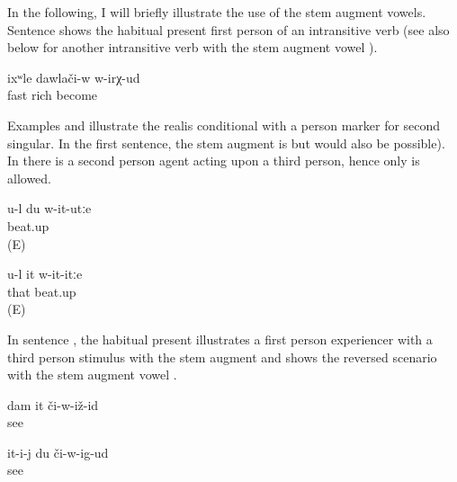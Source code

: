 In the following, I will briefly illustrate the use of the stem augment vowels. Sentence  shows the habitual present first person of an intransitive verb (see also  below for another intransitive verb with the stem augment vowel ).
%
\begin{exe}
	\ex	\label{ex:‎‎‎I become rich fast}
	\gll	ixʷle	dawlači-w	w-irχ-ud\\
		fast	rich	become\\
	\glt	{}
\end{exe}

Examples  and  illustrate the realis conditional with a person marker for second singular. In the first sentence, the stem augment is  but  would also be possible). In  there is a second person agent acting upon a third person, hence only  is allowed. 
%
\begin{exe}
	\ex	\label{ex:if you beat me up}
	\gll	u-l	du	w-it-utːe\\
				beat.up\\
	\glt	{} (E)

	\ex	\label{ex:if you beat him up}
	\gll	u-l	it	w-it-itːe\\
			that	beat.up\\
	\glt	{} (E)
\end{exe}

In sentence , the habitual present illustrates a first person experiencer with a third person stimulus with the stem augment  and  shows the reversed scenario with the stem augment vowel .
%
\begin{exe}
	\ex	\label{ex:habitual present stem augmentation@20}
	\begin{xlist}
		\ex	\label{ex:I will see him@20a}
		\gll	dam	it 	či-w-iž-id\\
					see\\
		\glt	{}

		\ex	\label{ex:S/he will see me@20c}
		\gll	it-i-j	du	či-w-ig-ud\\
					see\\
		\glt	{}
	\end{xlist}
\end{exe}

